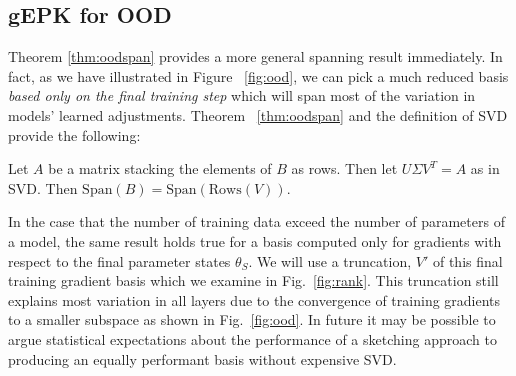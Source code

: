 \subsection{gEPK for OOD}
Theorem \ref{thm:oodspan} provides a more general spanning result immediately. In fact, as we have illustrated in Figure ~\ref{fig:ood}, we can pick a much reduced basis \emph{based only on the final training step} which will span most of the variation in models' learned adjustments. Theorem ~\ref{thm:oodspan} and the definition of SVD provide the following:
\begin{corollary}
    Let $A$ be a matrix stacking the elements of $B$ as rows. Then let $U \Sigma V^T = A$ as in SVD. Then $\text{Span}(B) = \text{Span}(\text{Rows}(V))$. 
\end{corollary} 
In the case that  the number of training data exceed the number of parameters of a model, the same result holds true for a basis computed only for gradients with respect to the final parameter states $\theta_S$. We will use a truncation, $V'$ of this final training gradient basis which we examine in Fig.~\ref{fig:rank}. This truncation still explains most variation in all layers due to the convergence of training gradients to a smaller subspace as shown in Fig.~\ref{fig:ood}. In future it may be possible to argue statistical expectations about the performance of a sketching approach to producing an equally performant basis without expensive SVD. 




